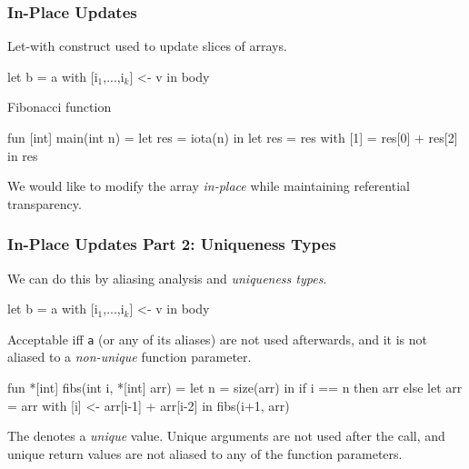 \documentclass{beamer}
\renewcommand{\emph}[1]{\textcolor{structure}{#1}}
\newcommand{\emp}[1]{\textcolor{DikuRed}{ #1}}
\newcommand{\mymath}[1]{$ #1 $}
\newcommand{\myindx}[1]{_{#1}}
\begin{document}





\begin{frame}[fragile,t]
  \frametitle{In-Place Updates}

  Let-with construct used to update slices of arrays.

  \begin{colorcode}
    let b = a with [i\mymath{\myindx{1}},...,i\mymath{\myindx{k}}] <- v
    in body
  \end{colorcode}

  \pause

  \begin{block}{Fibonacci function}
    \begin{colorcode}
fun [int] main(int n) =
  let res = iota(n) in
  let res = res with [1] = res[0] + res[2]
  in res
    \end{colorcode}
  \end{block}

  We would like to modify the array {\em in-place} while maintaining
  referential transparency.

\end{frame}

\begin{frame}[fragile,t]
  \frametitle{In-Place Updates Part 2: Uniqueness Types}

  We can do this by aliasing analysis and {\em uniqueness types}.

  \begin{colorcode}
    let b = a with [i\mymath{\myindx{1}},...,i\mymath{\myindx{k}}] <- v
    in body
  \end{colorcode}

  Acceptable iff {\tt a} (or any of its aliases) are not used
  afterwards, and it is not aliased to a {\it non-unique} function
  parameter.

  \begin{colorcode}
    fun \emp{*}[int] fibs(int i, \emp{*}[int] arr) =
      let n = size(arr) in
      if i == n
        then arr
        else
          let arr = arr with [i] <- arr[i-1] + arr[i-2] in
          fibs(i+1, arr)
  \end{colorcode}

  The {\tt *} denotes a {\em unique} value.  Unique arguments are not
  used after the call, and unique return values are not aliased to any
  of the function parameters.

\end{frame}
\end{document}
